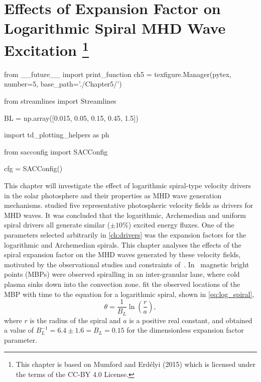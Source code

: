 
\chapter[Effects of Expansion Factor on Logarithmic Spiral MHD Wave Excitation]{Effects of Expansion Factor on Logarithmic Spiral MHD Wave Excitation \footnote{This chapter is based on Mumford and Erd\'elyi (2015) which is licensed under the terms of the CC-BY 4.0 License.}}\label{ch:expfac}

\begin{pycode}[chapter5]
from __future__ import print_function
ch5 = texfigure.Manager(pytex, number=5, base_path='./Chapter5/')

from streamlines import Streamlines

BL = np.array([0.015, 0.05, 0.15, 0.45, 1.5])

import td_plotting_helpers as ph

from sacconfig import SACConfig

cfg = SACConfig()
\end{pycode}

This chapter will investigate the effect of logarithmic spiral-type velocity drivers in the solar photosphere and their properties as MHD wave generation mechanisms.
 studied five representative photospheric velocity fields as drivers for MHD waves.
It was concluded that the logarithmic, Archemedian and uniform spiral drivers all generate similar ($\pm 10\%$) excited energy fluxes.
One of the parameters selected arbitrarily in \cref{ch:drivers} was the expansion factors for the logarithmic and Archemedian spirals.
This chapter analyses the effects of the spiral expansion factor on the MHD waves generated by these velocity fields, motivated by the observational studies and constraints of~\cite{bonet2008}.
In~\cite{bonet2008} magnetic bright points (MBPs) were observed spiralling in an inter-granular lane, where cold plasma sinks down into the convection zone.
\cite{bonet2008} fit the observed locations of the MBP with time to the equation for a logarithmic spiral, shown in \cref{eq:log_spiral},
\begin{equation}
\theta = \frac{1}{B_L}\ln\left(\frac{r}{a}\right),
\label{eq:log_spiral}
\end{equation}
\citep{feynman1964} where $r$ is the radius of the spiral and $a$ is a positive real constant, and obtained a value of $B_L^{-1} = 6.4 \pm 1.6 = B_L = 0.15$ for the dimensionless expansion factor parameter.

